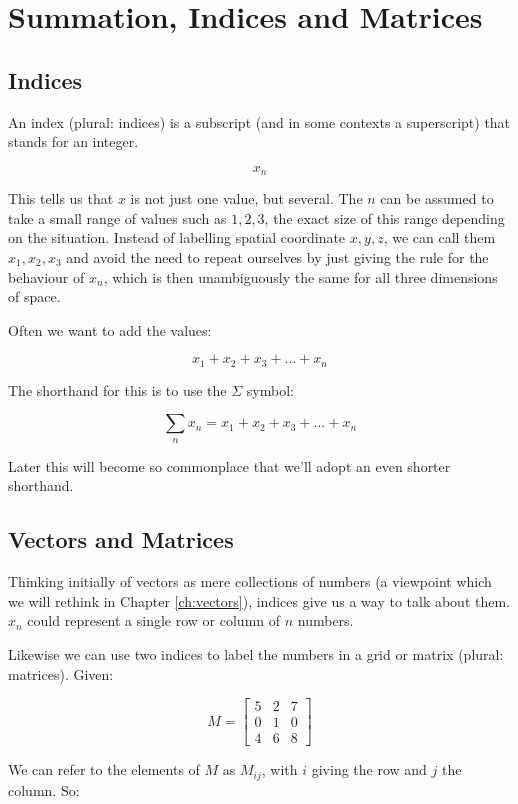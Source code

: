 \chapter{Summation, Indices and Matrices}

\section{Indices}

An index (plural: indices) is a subscript (and in some contexts a superscript) that stands for an integer.

$$x_n$$

This tells us that $x$ is not just one value, but several. The $n$ can be assumed to take a small range of values such as $1, 2, 3$, the exact size of this range depending on the situation. Instead of labelling spatial coordinate $x, y, z$, we can call them $x_1, x_2, x_3$ and avoid the need to repeat ourselves by just giving the rule for the behaviour of $x_n$, which is then unambiguously the same for all three dimensions of space.

Often we want to add the values:

$$x_1 + x_2 + x_3 + \dots + x_n$$

The shorthand for this is to use the $\Sigma$ symbol:

$$\sum_n{x_n} = x_1 + x_2 + x_3 + \dots + x_n$$

Later this will become so commonplace that we'll adopt an even shorter shorthand.

\section{Vectors and Matrices}

Thinking initially of vectors as mere collections of numbers (a viewpoint which we will rethink in Chapter \ref{ch:vectors}), indices give us a way to talk about them. $x_n$ could represent a single row or column of $n$ numbers.

Likewise we can use two indices to label the numbers in a grid or matrix (plural: matrices). Given:

$$
M = \begin{bmatrix}
5 & 2 & 7 \\
0 & 1 & 0 \\
4 & 6 & 8
\end{bmatrix}
$$

We can refer to the elements of $M$ as $M_{ij}$, with $i$ giving the row and $j$ the column. So:


